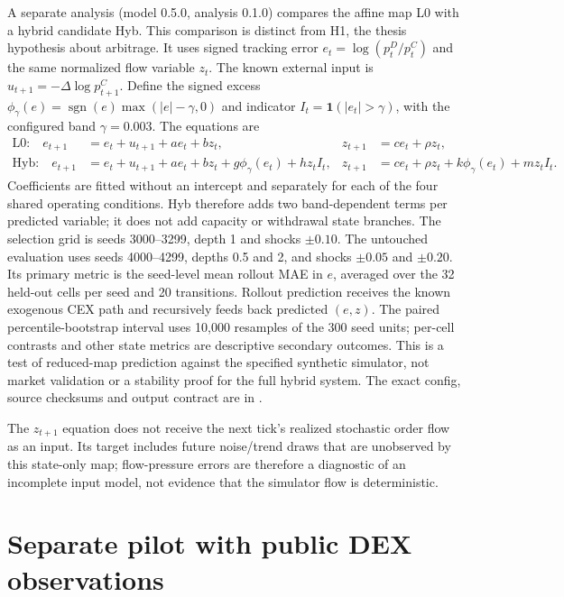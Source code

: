 A separate analysis (model 0.5.0, analysis 0.1.0) compares the affine map L0 with a hybrid candidate Hyb. This comparison is distinct from H1, the thesis hypothesis about arbitrage. It uses signed tracking error $e_t=\log(p_t^D/p_t^C)$ and the same normalized flow variable $z_t$. The known external input is $u_{t+1}=-\Delta\log p^C_{t+1}$. Define the signed excess $\phi_\gamma(e)=\operatorname{sgn}(e)\max(|e|-\gamma,0)$ and indicator $I_t=\mathbf{1}(|e_t|>\gamma)$, with the configured band $\gamma=0.003$. The equations are
\begin{align}
  \text{L0:}\quad e_{t+1}&=e_t+u_{t+1}+a e_t+b z_t,& z_{t+1}&=c e_t+\rho z_t,\\
  \text{Hyb:}\quad e_{t+1}&=e_t+u_{t+1}+a e_t+b z_t+g\phi_\gamma(e_t)+h z_t I_t,&
  z_{t+1}&=c e_t+\rho z_t+k\phi_\gamma(e_t)+m z_t I_t.
\end{align}
Coefficients are fitted without an intercept and separately for each of the four shared operating conditions. Hyb therefore adds two band-dependent terms per predicted variable; it does not add capacity or withdrawal state branches. The selection grid is seeds 3000--3299, depth 1 and shocks $\pm0.10$. The untouched evaluation uses seeds 4000--4299, depths 0.5 and 2, and shocks $\pm0.05$ and $\pm0.20$. Its primary metric is the seed-level mean rollout MAE in $e$, averaged over the 32 held-out cells per seed and 20 transitions. Rollout prediction receives the known exogenous CEX path and recursively feeds back predicted $(e,z)$. The paired percentile-bootstrap interval uses 10,000 resamples of the 300 seed units; per-cell contrasts and other state metrics are descriptive secondary outcomes. This is a test of reduced-map prediction against the specified synthetic simulator, not market validation or a stability proof for the full hybrid system. The exact config, source checksums and output contract are in .

The $z_{t+1}$ equation does not receive the next tick's realized stochastic order flow as an input. Its target includes future noise/trend draws that are unobserved by this state-only map; flow-pressure errors are therefore a diagnostic of an incomplete input model, not evidence that the simulator flow is deterministic.

\section{Separate pilot with public DEX observations}
\label{sec:dex-pilot-method}

